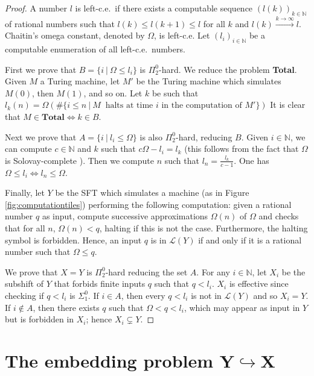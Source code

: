 \documentclass[a4paper]{article}
\newcommand{\Le}{\mathcal{L}}
\newcommand{\N}{\mathbb{N}}
\theoremstyle{definition}
\begin{document}
\begin{proof}
    A number $l$ is left-c.e.\ if there exists a computable sequence $(l(k))_{k \in \N}$ of rational numbers such that $l(k)\le l(k+1) \le l$ for all $k$ and $l(k) \overset{k \rightarrow \infty}{\longrightarrow}l$. Chaitin's omega constant, denoted by $\Omega$, is left-c.e. Let $(l_i)_{i \in \N}$ be a computable enumeration of all left-c.e.\ numbers.
    
    First we prove that $B=\{i \ | \ \Omega \le l_i \}$ is $\Pi^0_2$-hard. We reduce the problem \textbf{Total}. Given $M$ a Turing machine, let $M'$ be the Turing machine which simulates $M(0)$, then $M(1)$, and so on. Let $k$ be such that $l_k(n)=\Omega(\#\{i\le n \ | \ M \ \mbox{ halts at time } i \mbox{ in the computation of } M' \})$
    It is clear that $M \in \textbf{Total} \Leftrightarrow k \in B$.
    
    Next we prove that $A=\{i \ | \ l_i \le \Omega\}$ is also $\Pi^0_2$-hard, reducing $B$. Given $i\in \N$, we can compute $c \in \N$ and $k$ such that $c\Omega-l_i =l_k$ (this follows from the fact that $\Omega$ is Solovay-complete \cite[Definition~3.2.28]{Nies}). Then we compute $n$ such that $l_n=\frac{l_k}{c-1}$. One has $\Omega \le l_i \Leftrightarrow l_n \le \Omega$.

     Finally, let $Y$ be the SFT which simulates a machine (as in Figure \ref{fig:computationtiles}) performing the following computation: given a rational number $q$ as input, compute successive approximations $\Omega(n)$ of $\Omega$ and checks that for all $n$, $\Omega(n) < q$, halting if this is not the case. Furthermore, the halting symbol is forbidden. Hence, an input $q$ is in $\Le(Y)$ if and only if it is a rational number such that $\Omega \le q$.

    We prove that $X=Y$ is $\Pi^0_2$-hard reducing the set $A$. For any $i \in \N$, let $X_i$ be the subshift of $Y$ that forbids finite inputs $q$ such that $q < l_i$. $X_i$ is effective since checking if $q<l_i$ is $\Sigma^0_1$. If $i \in A$, then every $q < l_i$ is not in $\Le(Y)$ and so $X_i=Y$. If $i \notin A$, then there exists $q$ such that $\Omega < q < l_i$, which may appear as input in $Y$ but is forbidden in $X_i$; hence $X_i \subsetneq Y$.
\end{proof}

\section{The embedding problem $\mathbf{Y\hookrightarrow X}$}\label{sec:Y-embeds-X}
\end{document}
